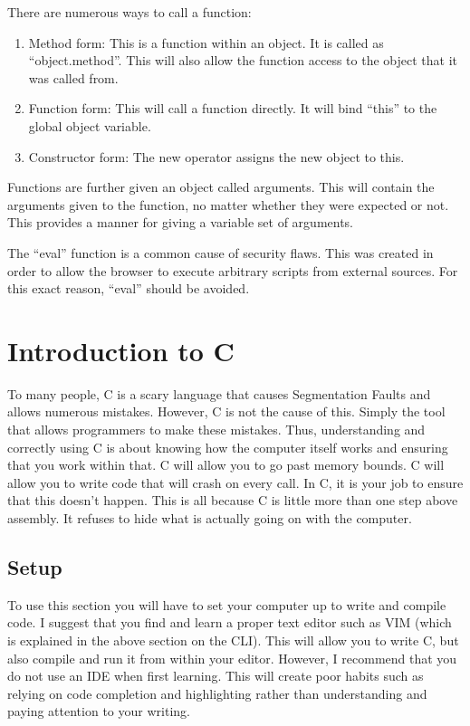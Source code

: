 			There are numerous ways to call a function:
			\begin{enumerate}
				\item Method form: This is a function within an object. 
					It is called as ``object.method''. 
					This will also allow the function access to the object that it was called from. 
				\item Function form: This will call a function directly. 
					It will bind ``this'' to the global object variable. 
				\item Constructor form: The new operator assigns the new object to this. 
			\end{enumerate}

			Functions are further given an object called arguments. 
			This will contain the arguments given to the function, no matter whether they were expected or not. 
			This provides a manner for giving a variable set of arguments. 

			The ``eval'' function is a common cause of security flaws. 
			This was created in order to allow the browser to execute arbitrary scripts from external sources. 
			For this exact reason, ``eval'' should be avoided. 
	\section{Introduction to C}
		To many people, C is a scary language that causes Segmentation Faults and allows numerous mistakes. 
		However, C is not the cause of this. Simply the tool that allows programmers to make these mistakes. 
		Thus, understanding and correctly using C is about knowing how the computer itself works and ensuring that you work within that. 
		C will allow you to go past memory bounds. 
		C will allow you to write code that will crash on every call. 
		In C, it is your job to ensure that this doesn't happen. 
		This is all because C is little more than one step above assembly. 
		It refuses to hide what is actually going on with the computer. 

		\subsection{Setup}
			To use this section you will have to set your computer up to write and compile code. 
			I suggest that you find and learn a proper text editor such as VIM (which is explained in the above section on the CLI).
			This will allow you to write C, but also compile and run it from within your editor. 
			However, I recommend that you do not use an IDE when first learning. 
			This will create poor habits such as relying on code completion and highlighting rather than understanding and paying attention to your writing. 

